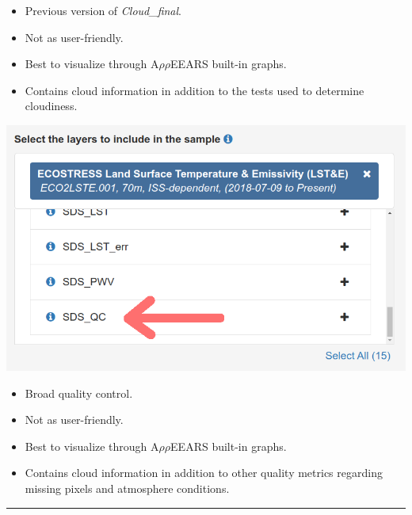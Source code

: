 \documentclass[oneside,a4paper,11pt,explicit]{book}
\begin{document}
\begin{tcbraster}[raster columns=3, sharp corners, 
		raster equal height, raster column skip=-.5mm]
\begin{tcolorbox}[colback=yellow!5!white,colframe=green!20!black, colbacktitle=green!60!black,title=SDS\_CloudMask]
\begin{center}
			\end{center}
			\begin{itemize}[leftmargin=*]
				\item Previous version of \textit{Cloud\_final}.
				\item Not as user-friendly.
				\item Best to visualize through A$\rho\rho$EEARS built-in graphs.
				\item Contains cloud information in addition to the tests used to determine cloudiness.
			\end{itemize}
		\end{tcolorbox}
		\begin{tcolorbox}[colback=yellow!5!white,colframe=green!20!black,
			colbacktitle=green!60!black,title=SDS\_QC]
			\begin{center}
				\includegraphics[width=\columnwidth]{SDS_QC.png}
			\end{center}
			\begin{itemize}[leftmargin=*]
				\item Broad quality control.
				\item Not as user-friendly.
				\item Best to visualize through A$\rho\rho$EEARS built-in graphs.
				\item Contains cloud information in addition to other quality metrics regarding missing pixels and atmosphere conditions.
			\end{itemize}
		\end{tcolorbox}
	\end{tcbraster}
	
	\vspace{.25em}
	
	\hrule
	
\end{document}
